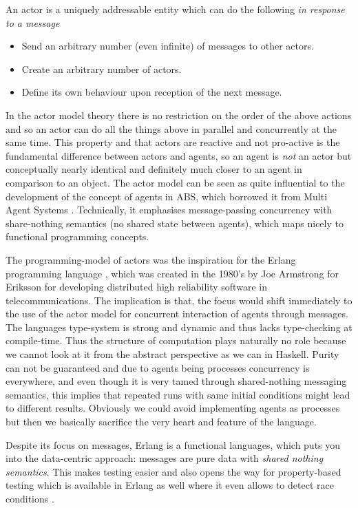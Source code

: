 An actor is a uniquely addressable entity which can do the following \textit{in response to a message}
\begin{itemize}
	\item Send an arbitrary number (even infinite) of messages to other actors.
	\item Create an arbitrary number of actors.
	\item Define its own behaviour upon reception of the next message.
\end{itemize}

In the actor model theory there is no restriction on the order of the above actions and so an actor can do all the things above in parallel and concurrently at the same time. This property and that actors are reactive and not pro-active is the fundamental difference between actors and agents, so an agent is \textit{not} an actor but conceptually nearly identical and definitely much closer to an agent in comparison to an object. The actor model can be seen as quite influential to the development of the concept of agents in ABS, which borrowed it from Multi Agent Systems \cite{wooldridge_introduction_2009}. Technically, it emphasises message-passing concurrency with share-nothing semantics (no shared state between agents), which maps nicely to functional programming concepts.

The programming-model of actors \cite{agha_actors:_1986} was the inspiration for the Erlang programming language \cite{armstrong_erlang_2010}, which was created in the 1980's by Joe Armstrong for Eriksson for developing distributed high reliability software in telecommunications. The implication is that, the focus would shift immediately to the use of the actor model for concurrent interaction of agents through messages. The languages type-system is strong and dynamic and thus lacks type-checking at compile-time. Thus the structure of computation plays naturally no role because we cannot look at it from the abstract perspective as we can in Haskell. Purity can not be guaranteed and due to agents being processes concurrency is everywhere, and even though it is very tamed through shared-nothing messaging semantics, this implies that repeated runs with same initial conditions might lead to different results. Obviously we could avoid implementing agents as processes but then we basically sacrifice the very heart and feature of the language.

Despite its focus on messages, Erlang is a functional languages, which puts you into the data-centric approach: messages are pure data with \textit{shared nothing semantics}. This makes testing easier and also opens the way for property-based testing which is available in Erlang as well where it even allows to detect race conditions \cite{claessen_finding_2009}. 

